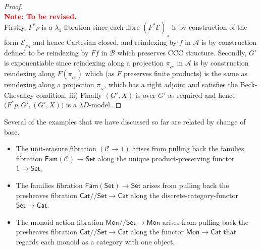 \documentclass[a4paper,UKenglish]{lipics}
\newcommand\note[1]{{ \bf \textcolor{red} {\vspace{2mm}\; \\ Note: #1\\}}}
\newcommand{\LamOneFib}{$\lambda_1$-fibration\xspace}
\newcommand{\ra}{\rightarrow}
\newcommand{\msf}[1]{\mathsf{#1}} %
\newcommand{\Mon}{\msf{Mon}}
\newcommand{\Set}{\msf{Set}}
\newcommand{\Cat}{\msf{Cat}}
\newcommand{\Fam}[1]{\msf{Fam}(#1)}
\newcommand{\LAb}{\msf{L}_{\msf{Ab}}}
\newcommand{\terminal}{\msf{1}}
\newcommand{\A}{\mathcal{A}}
\newcommand{\B}{\mathcal{B}}
\newcommand{\C}{\mathcal{C}}
\newcommand{\E}{\mathcal{E}}
\newcommand{\fibre}[2]{#1_{_{#2}}}
\newcommand{\fibreE}[1]{\E_{_{#1}}}
\newcommand{\GroupSet}[1]{#1/\!/\Set}
\newcommand{\MonSet}{\GroupSet{\Mon}}
\newcommand{\CatSet}{\GroupSet{\Cat}}
\newcommand{\bbracket}[1]{\bigl( #1 \bigr)}
\begin{document}
\begin{proof}\note{To be revised.}
Firstly, $F^*p$ is a \LamOneFib since each fibre $\fibre{(F^*\E)}{A}$ is by construction of the form $\fibreE{FA}$ and hence Cartesian closed, and  reindexing by $f$ in $\A$ is by construction defined to be reindexing by $Ff$ in $\B$ which preserves CCC structure. Secondly, $G'$ is exponentiable since reindexing along a projection $\pi_{_{G'}}$ in $\A$ is by construction reindexing along $F(\pi_{_{G'}})$ which (as $F$ preserves finite products) is the same as reindexing along a projection $\pi_{_{G}}$, which has a right adjoint and satisfies the Beck-Chevalley condition. iii) Finally $(G', X)$ is over $G'$ as required and hence $\bbracket{F^{\ast}p, G', (G',X)}$ is a $\lambda D$-model.
\end{proof}

Several of the examples that we have discussed so far are related by change of base.
\begin{itemize}
\item The unit-erasure fibration $(\C\to 1)$ arises from pulling back the families fibration
$\Fam\C\to\Set$ along the unique product-preserving functor $1\to\Set$.
\item The families fibration $\Fam\Set\to\Set$ arises from pulling back the presheaves fibration
$\CatSet\to\Cat$ along the discrete-category-functor $\Set\to\Cat$.
\item The monoid-action fibration $\MonSet\to\Mon$ arises from pulling
  back the presheaves fibration $\CatSet\to\Cat$ along the functor
  $\Mon\to\Cat$ that regards each monoid as a category with one
  object.
\end{itemize}

%
%
\end{document}

